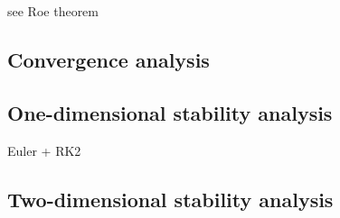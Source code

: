 see Roe theorem \cite[p.417]{Toro}
\subsection{Convergence analysis}
\subsection{One-dimensional stability analysis}
Euler + RK2
\subsection{Two-dimensional stability analysis}



